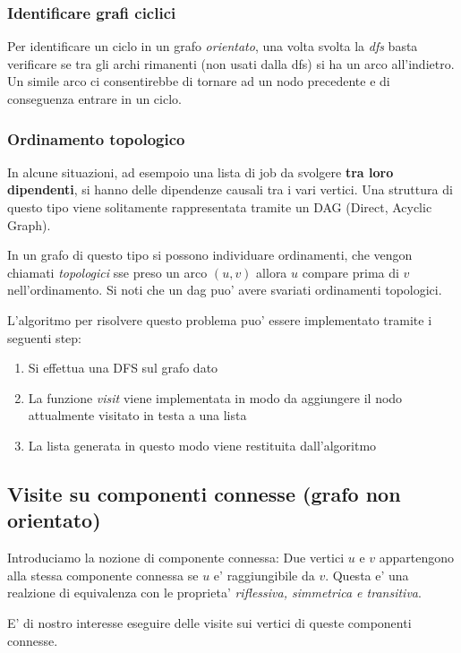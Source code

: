 \documentclass{article}
\begin{document}
\subsubsection{Identificare grafi ciclici}

Per identificare un ciclo in un grafo \emph{orientato}, una volta svolta la
\emph{dfs} basta verificare se tra gli archi rimanenti (non usati dalla dfs) si
ha un arco all'indietro. Un simile arco ci consentirebbe di tornare ad un nodo
precedente e di conseguenza entrare in un ciclo.

\subsubsection{Ordinamento topologico}

In alcune situazioni, ad esempoio una lista di job da svolgere \textbf{tra loro
dipendenti}, si hanno delle dipendenze causali tra i vari vertici. Una struttura
di questo tipo viene solitamente rappresentata tramite un DAG (Direct, Acyclic Graph).

In un grafo di questo tipo si possono individuare ordinamenti, che vengon chiamati
\emph{topologici} sse preso un arco $(u, v)$ allora $u$ compare prima di $v$
nell'ordinamento. Si noti che un dag puo' avere svariati ordinamenti topologici.

\noindent L'algoritmo per risolvere questo problema puo' essere implementato tramite i seguenti step:

\begin{enumerate}
  \item Si effettua una DFS sul grafo dato
  \item La funzione \emph{visit} viene implementata in modo da aggiungere il
    nodo attualmente visitato in testa a una lista
  \item La lista generata in questo modo viene restituita dall'algoritmo
\end{enumerate}

\subsection{Visite su componenti connesse (grafo non orientato)}

Introduciamo la nozione di componente connessa: Due vertici $u$ e $v$ appartengono
alla stessa componente connessa se $u$ e' raggiungibile da $v$. Questa e' una
realzione di equivalenza con le proprieta' \emph{riflessiva, simmetrica e transitiva}.

E' di nostro interesse eseguire delle visite sui vertici di queste componenti connesse.
\end{document}
